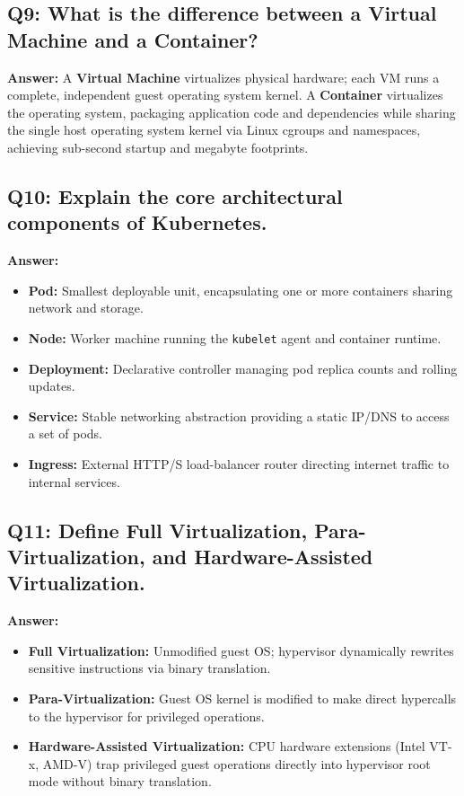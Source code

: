 \subsection*{Q9: What is the difference between a Virtual Machine and a Container?}
\textbf{Answer:} A \textbf{Virtual Machine} virtualizes physical hardware; each VM runs a complete, independent guest operating system kernel. A \textbf{Container} virtualizes the operating system, packaging application code and dependencies while sharing the single host operating system kernel via Linux cgroups and namespaces, achieving sub-second startup and megabyte footprints.

\subsection*{Q10: Explain the core architectural components of Kubernetes.}
\textbf{Answer:}
\begin{itemize}
    \item \textbf{Pod:} Smallest deployable unit, encapsulating one or more containers sharing network and storage.
    \item \textbf{Node:} Worker machine running the \texttt{kubelet} agent and container runtime.
    \item \textbf{Deployment:} Declarative controller managing pod replica counts and rolling updates.
    \item \textbf{Service:} Stable networking abstraction providing a static IP/DNS to access a set of pods.
    \item \textbf{Ingress:} External HTTP/S load-balancer router directing internet traffic to internal services.
\end{itemize}

\subsection*{Q11: Define Full Virtualization, Para-Virtualization, and Hardware-Assisted Virtualization.}
\textbf{Answer:}
\begin{itemize}
    \item \textbf{Full Virtualization:} Unmodified guest OS; hypervisor dynamically rewrites sensitive instructions via binary translation.
    \item \textbf{Para-Virtualization:} Guest OS kernel is modified to make direct hypercalls to the hypervisor for privileged operations.
    \item \textbf{Hardware-Assisted Virtualization:} CPU hardware extensions (Intel VT-x, AMD-V) trap privileged guest operations directly into hypervisor root mode without binary translation.
\end{itemize}

